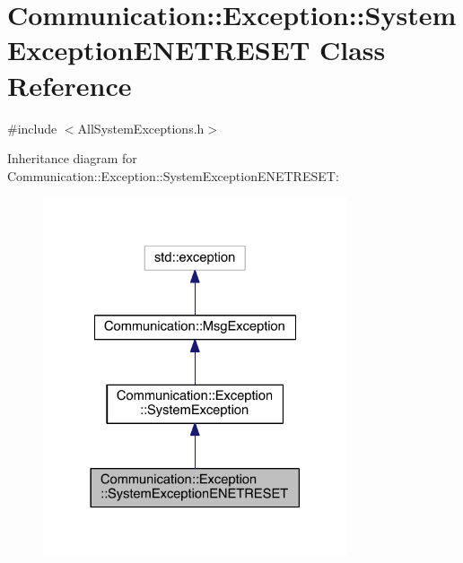 \hypertarget{class_communication_1_1_exception_1_1_system_exception_e_n_e_t_r_e_s_e_t}{}\section{Communication\+:\+:Exception\+:\+:System\+Exception\+E\+N\+E\+T\+R\+E\+S\+E\+T Class Reference}
\label{class_communication_1_1_exception_1_1_system_exception_e_n_e_t_r_e_s_e_t}


{\ttfamily \#include $<$All\+System\+Exceptions.\+h$>$}



Inheritance diagram for Communication\+:\+:Exception\+:\+:System\+Exception\+E\+N\+E\+T\+R\+E\+S\+E\+T\+:\nopagebreak
\begin{figure}[H]
\begin{center}
\leavevmode
\includegraphics[width=254pt]{class_communication_1_1_exception_1_1_system_exception_e_n_e_t_r_e_s_e_t__inherit__graph}
\end{center}
\end{figure}


